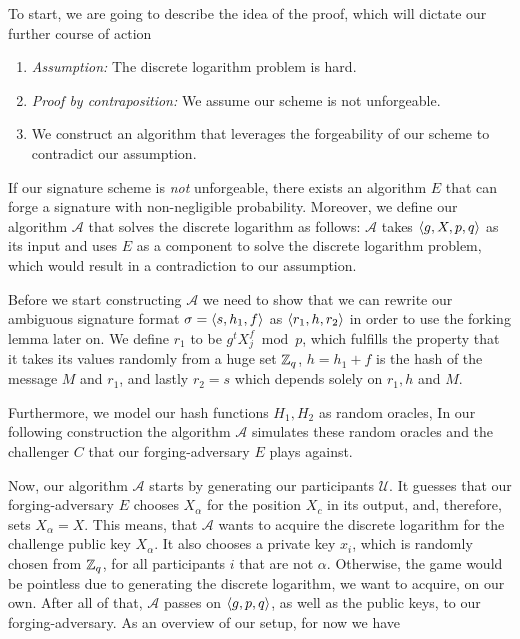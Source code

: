 To start, we are going to describe the idea of the proof, which will dictate our further course of action

\begin{enumerate}[1.)]
  \item \textit{Assumption:} The discrete logarithm problem is hard.
  \item \textit{Proof by contraposition:} We assume our scheme is not unforgeable.
  \item We construct an algorithm that leverages the forgeability of our scheme to contradict our assumption. 
\end{enumerate}
%
If our signature scheme is \textit{not} unforgeable, there exists an algorithm \(E\) that can forge a signature with non-negligible probability.
Moreover, we define our algorithm \(\mathcal{A}\) that solves the discrete logarithm as follows:
\(\mathcal{A}\) takes \(\langle g,X,p,q \rangle\) as its input and uses \(E\) as a component to solve the discrete logarithm problem, which would result in a contradiction to our assumption.

Before we start constructing \(\mathcal{A}\) we need to show that we can rewrite our ambiguous signature format \(\sigma = \langle s,h_1, f \rangle\) as \(\langle r_1, h, r_2 \rangle\) in order to use the forking lemma later on.
We define \(r_1\) to be \(g^t X_j^f \bmod p\), which fulfills the property that it takes its values randomly from a huge set \(\mathbb{Z}_q\), \(h = h_1 + f\) is the hash of the message \(M\) and \(r_1\), and lastly \(r_2 = s\) which depends solely on \(r_1, h\) and \(M\).

Furthermore, we model our hash functions \(H_1, H_2\) as random oracles, In our following construction the algorithm \(\mathcal{A}\) simulates these random oracles and the challenger \(C\) that our forging-adversary \(E\) plays against.

Now, our algorithm \(\mathcal{A}\) starts by generating our participants \(\mathcal{U}\). It guesses that our forging-adversary \(E\) chooses \(X_\alpha\) for the position \(X_c\) in its output, and, therefore, sets \(X_\alpha = X\).
This means, that \(\mathcal{A}\) wants to acquire the discrete logarithm for the challenge public key \(X_\alpha\).
It also chooses a private key \(x_i\), which is randomly chosen from \(\mathbb{Z}_q\), for all participants \(i\) that are not \(\alpha\).
Otherwise, the game would be pointless due to generating the discrete logarithm, we want to acquire, on our own.
After all of that, \(\mathcal{A}\) passes on \(\langle g,p,q \rangle\), as well as the public keys, to our forging-adversary.
As an overview of our setup, for now we have 

